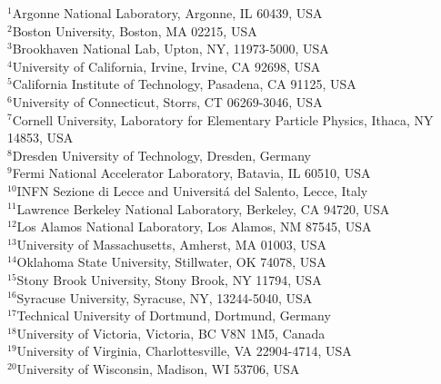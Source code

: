 \begin{center}

$^{1}$Argonne National Laboratory, Argonne, IL 60439, USA\\
$^{2}$Boston University, Boston, MA 02215, USA\\
$^{3}$Brookhaven National Lab, Upton, NY, 11973-5000, USA\\
$^{4}$University of California, Irvine, Irvine, CA 92698, USA\\
$^{5}$California Institute of Technology, Pasadena, CA 91125, USA\\
$^{6}$University of Connecticut, Storrs, CT 06269-3046, USA\\
$^{7}$Cornell University, Laboratory for Elementary Particle Physics, Ithaca, NY 14853, USA\\
$^{8}$Dresden University of Technology, Dresden, Germany\\
$^{9}$Fermi National Accelerator Laboratory, Batavia, IL 60510, USA\\
$^{10}$INFN Sezione di Lecce and Universit\'a del Salento, Lecce, Italy\\
$^{11}$Lawrence Berkeley National Laboratory, Berkeley, CA 94720, USA\\
$^{12}$Los Alamos National Laboratory, Los Alamos, NM 87545, USA\\
$^{13}$University of Massachusetts, Amherst, MA 01003, USA\\
$^{14}$Oklahoma State University, Stillwater, OK 74078, USA\\
$^{15}$Stony Brook University, Stony Brook, NY 11794, USA\\
$^{16}$Syracuse University, Syracuse, NY, 13244-5040, USA\\
$^{17}$Technical University of Dortmund, Dortmund, Germany\\
$^{18}$University of Victoria, Victoria, BC V8N 1M5, Canada\\
$^{19}$University of Virginia, Charlottesville, VA 22904-4714, USA\\
$^{20}$University of Wisconsin, Madison, WI 53706, USA\\



\end{center}




